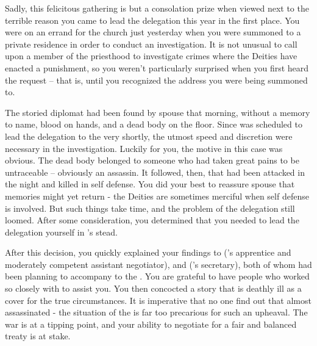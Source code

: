 \documentclass[char]{GL2020}
\begin{document}
Sadly, this felicitous gathering is but a consolation prize when viewed next to the terrible reason you came to lead the \pShip{} delegation this year in the first place. You were on an errand for the church just yesterday when you were summoned to a private residence in order to conduct an investigation. It is not unusual to call upon a member of the priesthood to investigate crimes where the Deities have enacted a punishment, so you weren't particularly surprised when you first heard the request -- that is, until you recognized the address you were being summoned to.

The storied diplomat \cHeadDiplomat{\full} had been found by \cHeadDiplomat{\their} spouse that morning, without a memory to \cHeadDiplomat{\their} name, blood on \cHeadDiplomat{\their} hands, and a dead body on the floor. Since \cHeadDiplomat{} was scheduled to lead the delegation to the \pSc{} very shortly, the utmost speed and discretion were necessary in the investigation. Luckily for you, the motive in this case was obvious. The dead body belonged to someone who had taken great pains to be untraceable – obviously an assassin. It followed, then, that \cHeadDiplomat{} had been attacked in the night and killed in self defense. You did your best to reassure \cHeadDiplomat{\their} spouse that \cHeadDiplomat{\their} memories might yet return - the Deities are sometimes merciful when self defense is involved. But such things take time, and the problem of the delegation still loomed. After some consideration, you determined that you needed to lead the delegation yourself in \cHeadDiplomat{}'s stead.

After this decision, you quickly explained your findings to \cJuniorStatesman{\full} (\cHeadDiplomat{}'s apprentice and moderately competent assistant negotiator), and \cChupLeader{\full} (\cHeadDiplomat{}'s secretary), both of whom had been planning to accompany \cHeadDiplomat{} to the \pSc{}. You are grateful to have people who worked so closely with \cHeadDiplomat{} to assist you. You then concocted a story that \cHeadDiplomat{} is deathly ill as a cover for the true circumstances. It is imperative that no one find out that \cHeadDiplomat{\they} \cHeadDiplomat{\were} almost assassinated - the situation of the \pShip{} is far too precarious for such an upheaval. The war is at a tipping point, and your ability to negotiate for a fair and balanced treaty is at stake.
\end{document}
